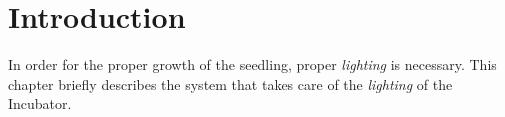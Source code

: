 \documentclass[../../main]{subfiles}
\begin{document}
\section{Introduction} \label{sec:}

In order for the proper growth of the seedling, proper \emph{lighting} is necessary.
This chapter briefly describes the system that takes care of the \emph{lighting} of
the Incubator.
\end{document}

